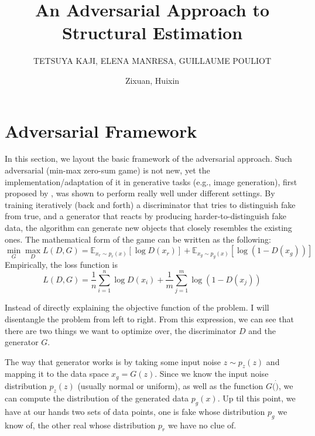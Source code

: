 \documentclass[12pt]{article}
\title{\textbf{An Adversarial Approach to Structural Estimation}}
\author{TETSUYA KAJI, ELENA MANRESA, GUILLAUME POULIOT}
\date{Zixuan, Huixin}
\begin{document}
\maketitle


\thispagestyle{empty}
\tableofcontents


\section{Adversarial Framework} \label{sec:framework}
In this section, we layout the basic framework of the adversarial approach.
Such adversarial (min-max zero-sum game) is not new, yet the
implementation/adaptation of it in generative tasks (e.g., image generation),
first proposed by \citet{goodfellow2014}, was shown to perform really well
under different settings. By training iteratively (back and forth) a
discriminator that tries to distinguish fake from true, and a generator that
reacts by producing harder-to-distinguish fake data, the algorithm can generate
new objects that closely resembles the existing ones. The mathematical form of
the game can be written as the following:
\begin{equation*}
    \min_G \max_D L(D, G)
    = \mathbb{E}_{x_r \sim p_{r}(x)} [\log D(x_r)] + \mathbb{E}_{x_g \sim p_g(x)} [\log(1 - D(x_g))]
\end{equation*}
Empirically, the loss function is
\begin{equation}\label{eq:empirical_loss}
    L(D, G)=\frac{1}{n} \sum_{i=1}^n \log D(x_i) + \frac{1}{m} \sum_{j=1}^m \log (1-D(x_j))
\end{equation}

Instead of directly explaining the objective function of the problem. I will
disentangle the problem from left to right. From this expression, we can see
that there are two things we want to optimize over, the discriminator $D$ and
the generator $G$.

The way that generator works is by taking some input noise $z\sim p_z(z)$ and
mapping it to the data space $x_g = G(z)$. Since we know the input noise
distribution $p_z(z)$ (usually normal or uniform), as well as the function
$G(\dot)$, we can compute the distribution of the generated data $p_g(x)$. Up
til this point, we have at our hands two sets of data points, one is fake whose
distribution $p_g$ we know of, the other real whose distribution $p_r$ we have
no clue of.
\end{document}
